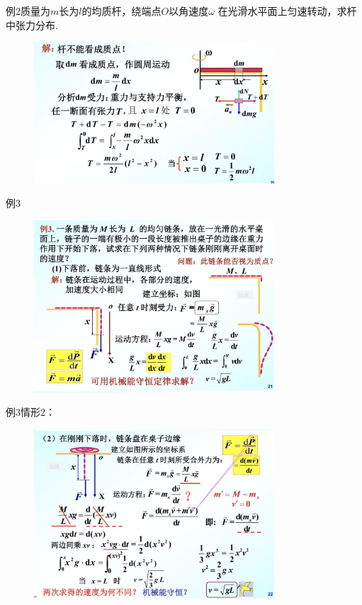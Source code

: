 \documentclass[10pt,a4paper]{article}
\begin{document}
例2质量为$m$长为$l$的均质杆，绕端点$O$以角速度$\omega$
在光滑水平面上匀速转动，求杆中张力分布.
\begin{figure}[h]
\centering
\includegraphics[width=0.8\textwidth]{eg2.jpg}
\end{figure}

例3
\begin{figure}[h]
    \centering
    \includegraphics[width=0.8\textwidth]{eg3-1.jpg}
    \end{figure}
\newpage
例3情形2：
\begin{figure}[h]
    \centering
    \includegraphics[width=0.8\textwidth]{eg3-2.jpg}
    \end{figure}
\end{document}
